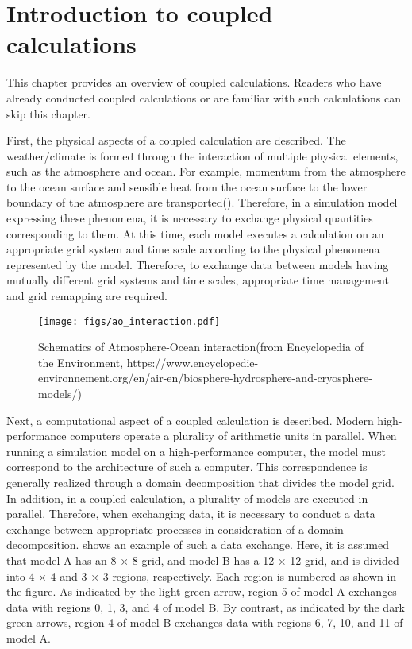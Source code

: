 \hypertarget{introduction-to-coupled-calculations}{%
\section{Introduction to coupled
calculations}\label{introduction-to-coupled-calculations}}

This chapter provides an overview of coupled calculations. Readers who
have already conducted coupled calculations or are familiar with such
calculations can skip this chapter.

First, the physical aspects of a coupled calculation are described. The
weather/climate is formed through the interaction of multiple physical
elements, such as the atmosphere and ocean. For example, momentum from
the atmosphere to the ocean surface and sensible heat from the ocean
surface to the lower boundary of the atmosphere are transported().
Therefore, in a simulation model expressing these phenomena, it is
necessary to exchange physical quantities corresponding to them. At this
time, each model executes a calculation on an appropriate grid system
and time scale according to the physical phenomena represented by the
model. Therefore, to exchange data between models having mutually
different grid systems and time scales, appropriate time management and
grid remapping are required.

\begin{figure}
\hypertarget{fig:ao_interaction}{%
\centering
\texttt{[image: figs/ao\_interaction.pdf]}
\caption{Schematics of Atmosphere-Ocean interaction(from Encyclopedia of
the Environment,
https://www.encyclopedie-environnement.org/en/air-en/biosphere-hydrosphere-and-cryosphere-models/)}\label{fig:ao_interaction}
}
\end{figure}

Next, a computational aspect of a coupled calculation is described.
Modern high-performance computers operate a plurality of arithmetic
units in parallel. When running a simulation model on a high-performance
computer, the model must correspond to the architecture of such a
computer. This correspondence is generally realized through a domain
decomposition that divides the model grid. In addition, in a coupled
calculation, a plurality of models are executed in parallel. Therefore,
when exchanging data, it is necessary to conduct a data exchange between
appropriate processes in consideration of a domain decomposition. shows
an example of such a data exchange. Here, it is assumed that model A has
an 8 × 8 grid, and model B has a 12 × 12 grid, and is divided into 4 × 4
and 3 × 3 regions, respectively. Each region is numbered as shown in the
figure. As indicated by the light green arrow, region 5 of model A
exchanges data with regions 0, 1, 3, and 4 of model B. By contrast, as
indicated by the dark green arrows, region 4 of model B exchanges data
with regions 6, 7, 10, and 11 of model A.

